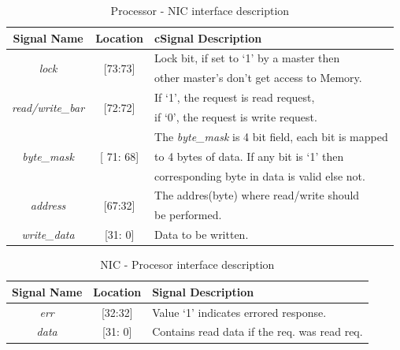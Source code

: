 \documentclass[12pt]{report}
\begin{document}
				\begin{table}[h]
					\centering
					\begin{tabular}{ccl}
						\hline
						\textbf{Signal Name} 			& \textbf{Location} 		&{c}\textbf{Signal Description}  \\ \hline
						\multirow{2}{*}{\textit{lock}}		& \multirow{2}{*}{[73:73]}	& Lock bit, if set to `1' by a master then\\
											&				& other master's don't get access to Memory.\\ \hline
						\multirow{2}{*}{\textit{read/write\_bar}}& \multirow{2}{*}{[72:72]}	& If `1', the request is read request,\\ 
											& 				& if `0', the request is write request.\\ \hline
						\multirow{3}{*}{\textit{byte\_mask}}	& \multirow{3}{*}{[ 71: 68]}	& The \textit{byte\_mask} is 4 bit field, each bit is mapped\\
											&				& to 4 bytes of data. If any bit is `1' then\\
											& 				& corresponding byte in data is valid else not.\\ \hline 
						\multirow{2}{*}{\textit{address}}   	& \multirow{2}{*}{[67:32]} 	& The addres(byte) where read/write should\\ 
											&				& be performed.\\ \hline
						\textit{write\_data}   			& [31: 0] 			& Data to be written.\\ \hline
					\end{tabular}
					\caption{Processor - NIC interface description}
					\label{tab:Proc-NIC-interface-req}
				\end{table}

				\begin{table}[!htbp]
					\centering
					\begin{tabular}{ccl}
						\hline
						\textbf{Signal Name} 		& \textbf{Location} 		&\textbf{Signal Description}  \\ \hline
						\textit{err}			& [32:32]			& Value `1' indicates errored response.\\\hline
						\textit{data}   		& [31: 0] 			& Contains read data if the req. was read req.\\ \hline
					\end{tabular}
					\caption{ NIC - Procesor interface description}
					\label{tab:NIC-Proc-interface-resp}
				\end{table}
\end{document}
